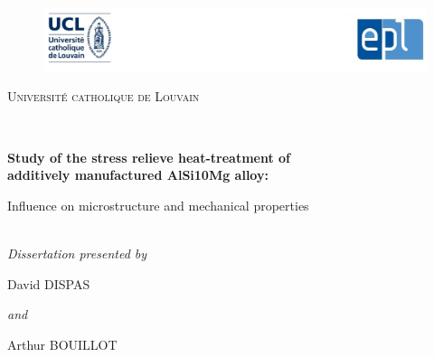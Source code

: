 \documentclass[
11pt, %
british, %
singlespacing, %
headsepline, %
]{MastersDoctoralThesis} %
\begin{document}
\frontmatter %

\pagestyle{plain} %


\begin{titlepage}
\begin{center}

\begin{figure}[h]
\centering
\includegraphics[width=14cm]{Images/logos.jpg}
\end{figure}

\vspace*{.06\textheight}
{\scshape\LARGE {Université catholique de Louvain}\par}\vspace{1.5cm} %

\HRule \\[0.4cm] %
\begin{changemargin}{-0.5cm}{-0.5cm} 
{\huge \bfseries {Study of the stress relieve heat-treatment of}\\
 \vspace{0.2cm}\hspace{0.2cm} \huge \bfseries {additively manufactured AlSi10Mg alloy:}}\vspace{0.3cm}

\LARGE{Influence on microstructure and mechanical properties}\par
\end{changemargin} 
\HRule \\[1.5cm] %
 \vspace{1cm}
\large \textit{Dissertation presented by}\\
\vspace{0.5cm}
\begin{minipage}[t]{0.35\textwidth}
\begin{flushleft} \large
David DISPAS
\end{flushleft}
\end{minipage}
\large \textit{and}
\begin{minipage}[t]{0.35\textwidth}
\begin{flushright} \large
Arthur BOUILLOT
\end{flushright}
\end{minipage}\\%
 

\end{center}
\end{titlepage}
\end{document}
